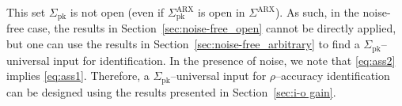 \documentclass[journal,twoside,web]{ieeecolor}
\newtheorem{remark}[theorem]{Remark}
\begin{document}
This set $\Sigma_\text{pk}$ is not open (even if $\Sigma_\text{pk}^\text{ARX}$ is open in $\Sigma^\text{ARX}$). As such, in the noise-free case, the results in \mbox{Section~\ref{sec:noise-free_open}} cannot be directly applied, but one can use the results in Section~\ref{sec:noise-free_arbitrary} to find a \mbox{$\Sigma_\text{pk}$--universal} input for identification. In the presence of noise, we note that \eqref{eq:ass2} implies \eqref{eq:ass1}. Therefore, a \mbox{$\Sigma_\text{pk}$--universal} input for $\rho$--accuracy identification can be designed using the results presented in Section~\ref{sec:i-o gain}. %


\end{document}

